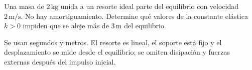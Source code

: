 Una masa de $2\,\mathrm{kg}$ unida a un resorte ideal parte del equilibrio con velocidad $2\,\mathrm{m/s}$. No hay amortiguamiento. Determine qué valores de la constante elástica $k>0$ impiden que se aleje más de $3\,\mathrm m$ del equilibrio.

Se usan segundos y metros. El resorte es lineal, el soporte está fijo y el desplazamiento se mide desde el equilibrio; se omiten disipación y fuerzas externas después del impulso inicial.

